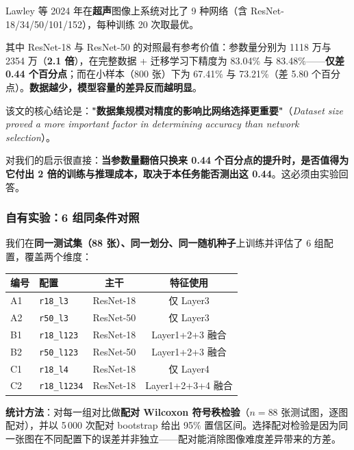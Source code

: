 \documentclass[UTF8,a4paper,10pt]{ctexart}
\begin{document}
Lawley 等 2024 年在\textbf{超声}图像上系统对比了 9 种网络（含 ResNet-18/34/50/101/152），每种训练 20 次取最优\cite{lawley2024network}。

其中 ResNet-18 与 ResNet-50 的对照最有参考价值：参数量分别为 1118 万与 2354 万（\textbf{2.1 倍}），在完整数据 + 迁移学习下精度为 83.04\% 与 83.48\%——\textbf{仅差 0.44 个百分点}；而在小样本（800 张）下为 67.41\% 与 73.21\%（差 5.80 个百分点）。\textbf{数据越少，模型容量的差异反而越明显}。

\noindent 该文的核心结论是：\textbf{"数据集规模对精度的影响比网络选择更重要"}（\textit{Dataset size proved a more important factor in determining accuracy than network selection}）。

\noindent 对我们的启示很直接：\textbf{当参数量翻倍只换来 0.44 个百分点的提升时，是否值得为它付出 2 倍的训练与推理成本，取决于本任务能否测出这 0.44}。这必须由实验回答。

\subsubsection{自有实验：6 组同条件对照}

我们在\textbf{同一测试集（88 张）、同一划分、同一随机种子}上训练并评估了 6 组配置，覆盖两个维度：

\begin{center}\small
\begin{tabular}{llcc}
\toprule
编号 & 配置 & 主干 & 特征使用 \\
\midrule
A1 & \texttt{r18\_l3} & ResNet-18 & 仅 Layer3 \\
A2 & \texttt{r50\_l3} & ResNet-50 & 仅 Layer3 \\
B1 & \texttt{r18\_l123} & ResNet-18 & Layer1+2+3 融合 \\
B2 & \texttt{r50\_l123} & ResNet-50 & Layer1+2+3 融合 \\
C1 & \texttt{r18\_l4} & ResNet-18 & 仅 Layer4 \\
C2 & \texttt{r18\_l1234} & ResNet-18 & Layer1+2+3+4 融合 \\
\bottomrule
\end{tabular}
\end{center}

\noindent\textbf{统计方法}：对每一组对比做\textbf{配对 Wilcoxon 符号秩检验}（$n=88$ 张测试图，逐图配对），并以 5\,000 次配对 bootstrap 给出 95\% 置信区间。选择配对检验是因为同一张图在不同配置下的误差并非独立——配对能消除图像难度差异带来的方差。


\end{document}
